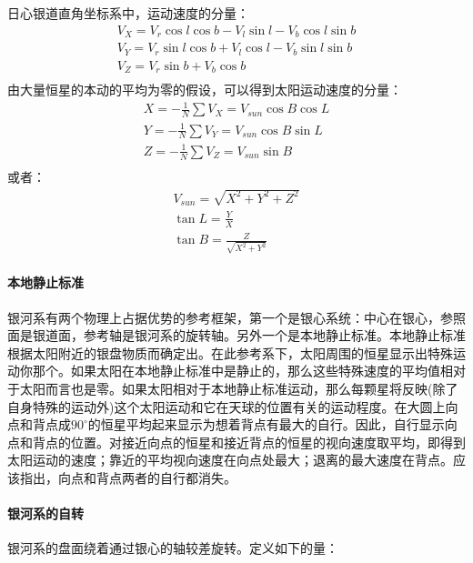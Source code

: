 日心银道直角坐标系中，运动速度的分量：
\begin{equation}
	\begin{aligned}
		V_{X}=V_{r}\cos l\cos b-V_{l}\sin l-V_{b}\cos l\sin b\\
		V_{Y}=V_{r}\sin l\cos b+V_{l}\cos l-V_{b}\sin l\sin b\\
		V_{Z}=V_{r}\sin b+V_{b}\cos b\\
	\end{aligned}
\end{equation}
由大量恒星的本动的平均为零的假设，可以得到太阳运动速度的分量：
\begin{equation}
	\begin{aligned}
		X=-\frac{1}{N}\sum V_{X}=V_{sun}\cos B\cos L\\
		Y=-\frac{1}{N}\sum V_{Y}=V_{sun}\cos B\sin L\\
		Z=-\frac{1}{N}\sum V_{Z}=V_{sun}\sin B\\
	\end{aligned}
\end{equation}
或者：
\begin{equation}
	\begin{aligned}
		V_{sun}=\sqrt{X^2+Y^2+Z^2}\\
		\tan L=\frac{Y}{X}\\
		\tan B=\frac{Z}{\sqrt{X^2+Y^2}}
	\end{aligned}
\end{equation}
\paragraph{本地静止标准}银河系有两个物理上占据优势的参考框架，第一个是银心系统：中心在银心，参照面是银道面，参考轴是银河系的旋转轴。另外一个是本地静止标准。本地静止标准根据太阳附近的银盘物质而确定出。在此参考系下，太阳周围的恒星显示出特殊运动你那个。如果太阳在本地静止标准中是静止的，那么这些特殊速度的平均值相对于太阳而言也是零。如果太阳相对于本地静止标准运动，那么每颗星将反映(除了自身特殊的运动外)这个太阳运动和它在天球的位置有关的运动程度。在大圆上向点和背点成$90^\circ$的恒星平均起来显示为想着背点有最大的自行。因此，自行显示向点和背点的位置。对接近向点的恒星和接近背点的恒星的视向速度取平均，即得到太阳运动的速度；靠近的平均视向速度在向点处最大；退离的最大速度在背点。应该指出，向点和背点两者的自行都消失。
\paragraph{银河系的自转}银河系的盘面绕着通过银心的轴较差旋转。定义如下的量：


